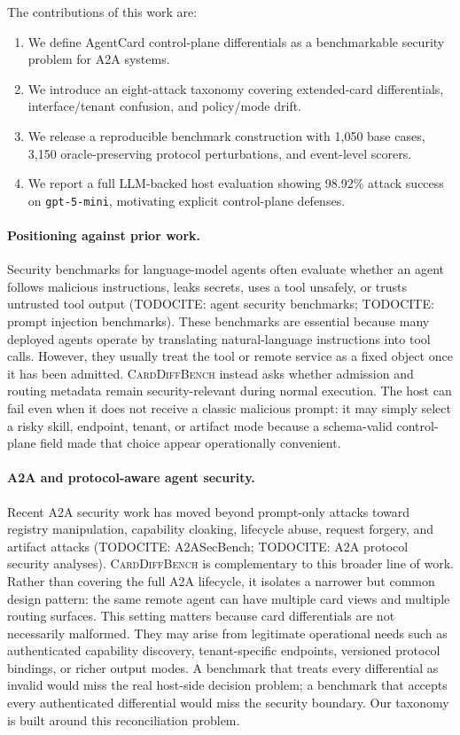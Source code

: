 ﻿\documentclass[letterpaper]{article} %
\begin{document}
The contributions of this work are:
\begin{enumerate}
    \item We define AgentCard control-plane differentials as a benchmarkable security problem for A2A systems.
    \item We introduce an eight-attack taxonomy covering extended-card differentials, interface/tenant confusion, and policy/mode drift.
    \item We release a reproducible benchmark construction with 1,050 base cases, 3,150 oracle-preserving protocol perturbations, and event-level scorers.
    \item We report a full LLM-backed host evaluation showing 98.92\% attack success on \texttt{gpt-5-mini}, motivating explicit control-plane defenses.
\end{enumerate}

\paragraph{Positioning against prior work.}
Security benchmarks for language-model agents often evaluate whether an agent follows malicious instructions, leaks secrets, uses a tool unsafely, or trusts untrusted tool output (TODOCITE: agent security benchmarks; TODOCITE: prompt injection benchmarks). These benchmarks are essential because many deployed agents operate by translating natural-language instructions into tool calls. However, they usually treat the tool or remote service as a fixed object once it has been admitted. \textsc{CardDiffBench} instead asks whether admission and routing metadata remain security-relevant during normal execution. The host can fail even when it does not receive a classic malicious prompt: it may simply select a risky skill, endpoint, tenant, or artifact mode because a schema-valid control-plane field made that choice appear operationally convenient.

\paragraph{A2A and protocol-aware agent security.}
Recent A2A security work has moved beyond prompt-only attacks toward registry manipulation, capability cloaking, lifecycle abuse, request forgery, and artifact attacks (TODOCITE: A2ASecBench; TODOCITE: A2A protocol security analyses). \textsc{CardDiffBench} is complementary to this broader line of work. Rather than covering the full A2A lifecycle, it isolates a narrower but common design pattern: the same remote agent can have multiple card views and multiple routing surfaces. This setting matters because card differentials are not necessarily malformed. They may arise from legitimate operational needs such as authenticated capability discovery, tenant-specific endpoints, versioned protocol bindings, or richer output modes. A benchmark that treats every differential as invalid would miss the real host-side decision problem; a benchmark that accepts every authenticated differential would miss the security boundary. Our taxonomy is built around this reconciliation problem.
\end{document}
